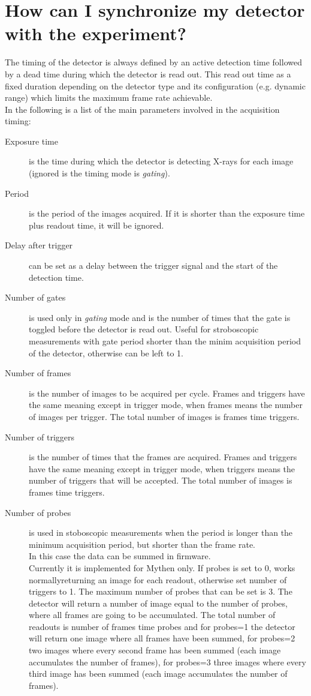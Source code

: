 \section{How can I synchronize my detector with the experiment?}\label{sec:timing}

The timing of the detector is always defined by an active detection time followed by a dead time during which the detector is read out. This read out time as a fixed duration depending on the detector type and its configuration (e.g. dynamic range) which limits the maximum frame rate achievable.\\
In the following is a list of the main parameters involved in the acquisition timing:
\begin{description}
\item[Exposure time] is the time during which the detector is detecting X-rays for each image (ignored is the timing mode is \textit{gating}).
\item[Period] is the period of the images acquired. If it is shorter than the exposure time plus readout time, it will be ignored.
\item[Delay after trigger] can be set as a delay between the trigger signal and the start of the detection time. 
\item[Number of gates] is used only in \textit{gating} mode and is the number of times that the gate is toggled before the detector is read out. Useful for stroboscopic measurements with gate period shorter than the minim acquisition period of the detector, otherwise can be left to 1.
\item[Number of frames] is the number of images to be acquired per cycle. Frames and triggers have the same meaning except in trigger mode, when frames means the number of images per trigger. The total number of images is frames time triggers.
\item[Number of triggers] is the number of times that the frames are acquired. Frames and triggers have the same meaning except in trigger mode, when triggers means the number of triggers that will be accepted. The total number of images is frames time triggers.
\item[Number of probes] is used in stoboscopic measurements when the period is longer than the minimum acquisition period, but shorter than the frame rate.\\
In this case the data can be summed in firmware. \\
Currently it is implemented for Mythen only. If probes is set to 0, works normallyreturning an image for each readout, otherwise set number of triggers to 1. The maximum number of probes that can be set is 3. The detector will return a number of image equal to the number of probes, where all frames are going to be accumulated. The total number of readouts is number of frames time probes and for  probes=1 the detector will return one image where all frames have been summed, for  probes=2 two images where every second frame has been summed (each image accumulates the number of frames), for probes=3 three images where every third image has been summed (each image accumulates the number of frames).\\

\end{description}
